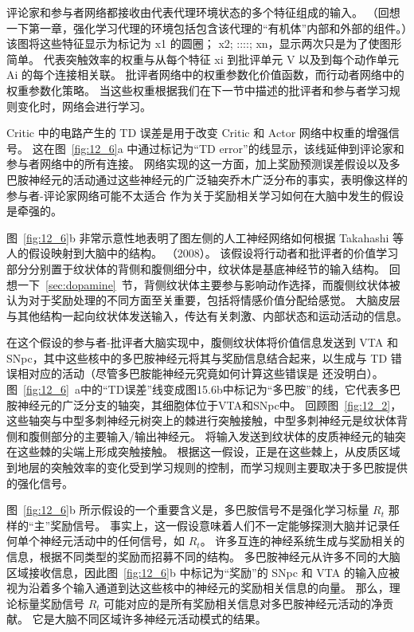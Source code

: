 {评论家和参与者网络都接收由代表代理环境状态的多个特征组成的输入。
（回想一下第一章，强化学习代理的环境包括包含该代理的“有机体”内部和外部的组件。）该图将这些特征显示为标记为 x1 的圆圈； x2; ::::; xn，显示两次只是为了使图形简单。
代表突触效率的权重与从每个特征 xi 到批评单元 V 以及到每个动作单元 Ai 的每个连接相关联。
批评者网络中的权重参数化价值函数，而行动者网络中的权重参数化策略。
当这些权重根据我们在下一节中描述的批评者和参与者学习规则变化时，网络会进行学习。


Critic 中的电路产生的 TD 误差是用于改变 Critic 和 Actor 网络中权重的增强信号。
这在图~\ref{fig:12_6}a 中通过标记为“TD error”的线显示，该线延伸到评论家和参与者网络中的所有连接。
网络实现的这一方面，加上奖励预测误差假设以及多巴胺神经元的活动通过这些神经元的广泛轴突乔木广泛分布的事实，表明像这样的参与者-评论家网络可能不太适合 作为关于奖励相关学习如何在大脑中发生的假设是牵强的。


图~\ref{fig:12_6}b 非常示意性地表明了图左侧的人工神经网络如何根据 Takahashi 等人的假设映射到大脑中的结构。 （2008）。
该假设将行动者和批评者的价值学习部分分别置于纹状体的背侧和腹侧细分中，纹状体是基底神经节的输入结构。
回想一下~\ref{sec:dopamine}~节，背侧纹状体主要参与影响动作选择，而腹侧纹状体被认为对于奖励处理的不同方面至关重要，包括将情感价值分配给感觉。
大脑皮层与其他结构一起向纹状体发送输入，传达有关刺激、内部状态和运动活动的信息。


在这个假设的参与者-批评者大脑实现中，腹侧纹状体将价值信息发送到 VTA 和 SNpc，其中这些核中的多巴胺神经元将其与奖励信息结合起来，以生成与 TD 错误相对应的活动（尽管多巴胺能神经元究竟如何计算这些错误是 还没明白）。
图~\ref{fig:12_6}~a中的“TD误差”线变成图15.6b中标记为“多巴胺”的线，它代表多巴胺神经元的广泛分支的轴突，其细胞体位于VTA和SNpc中。
回顾图~\ref{fig:12_2}，这些轴突与中型多刺神经元树突上的棘进行突触接触，中型多刺神经元是纹状体背侧和腹侧部分的主要输入/输出神经元。
将输入发送到纹状体的皮质神经元的轴突在这些棘的尖端上形成突触接触。
根据这一假设，正是在这些棘上，从皮质区域到地层的突触效率的变化受到学习规则的控制，而学习规则主要取决于多巴胺提供的强化信号。


图~\ref{fig:12_6}b 所示假设的一个重要含义是，多巴胺信号不是强化学习标量 $R_t$ 那样的“主”奖励信号。
事实上，这一假设意味着人们不一定能够探测大脑并记录任何单个神经元活动中的任何信号，如 $R_t$。
许多互连的神经系统生成与奖励相关的信息，根据不同类型的奖励而招募不同的结构。
多巴胺神经元从许多不同的大脑区域接收信息，因此图~\ref{fig:12_6}b 中标记为“奖励”的 SNpc 和 VTA 的输入应被视为沿着多个输入通道到达这些核中的神经元的奖励相关信息的向量。
那么，理论标量奖励信号 $R_t$ 可能对应的是所有奖励相关信息对多巴胺神经元活动的净贡献。
它是大脑不同区域许多神经元活动模式的结果。


}
